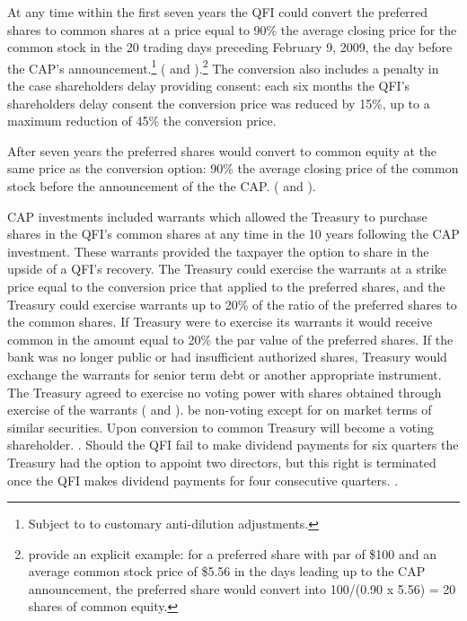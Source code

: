 \documentclass[12pt]{article}
\begin{document}
At any time within the first seven years the QFI could convert the preferred shares to common shares at a price equal to 90\% the average closing price for the common stock in the 20 trading days preceding February 9, 2009, the day before the CAP's announcement.\footnote{Subject to to customary anti-dilution adjustments.} (\citet{WhitePaper} and \citet{GW}).\footnote{\citet{GW} provide an explicit example: for a preferred share with par of \$100 and an average common stock price of \$5.56 in the days leading up to the CAP announcement, the preferred share would convert into 100/(0.90 x 5.56) = 20 shares of common equity.} The conversion also includes a penalty in the case shareholders delay providing consent: each six months the QFI's shareholders delay consent the conversion price was reduced by 15\%, up to a maximum reduction of 45\% the conversion price.


After seven years the preferred shares would convert to common equity at the same price as the conversion option: 90\% the average closing price of the common stock before the announcement of the the CAP. (\citet{WhitePaper} and \citet{GW}).


CAP investments included warrants which allowed the Treasury to purchase shares in the QFI's common shares at any time in the 10 years following the CAP investment. These warrants provided the taxpayer the option to share in the upside of a QFI's recovery. The Treasury could exercise the warrants at a strike price equal to the conversion price that applied to the preferred shares, and the Treasury could exercise warrants up to 20\% of the ratio of the preferred shares to the common shares. If Treasury were to exercise its warrants it would receive common in the amount equal to 20\% the par value of the preferred shares. If the bank was no longer public or had insufficient authorized shares, Treasury would exchange the warrants for senior term debt or another appropriate instrument. The Treasury agreed to exercise no voting power with shares obtained through exercise of the warrants (\citet{WhitePaper} and \citet{GW}). be non-voting except for on market terms of similar securities. Upon conversion to common Treasury will become a voting shareholder. \citep{Mofo}. Should the QFI fail to make dividend payments for six quarters the Treasury had the option to appoint two directors, but this right is terminated once the QFI makes dividend payments for four consecutive quarters. \citep{Mofo}.
\end{document}
